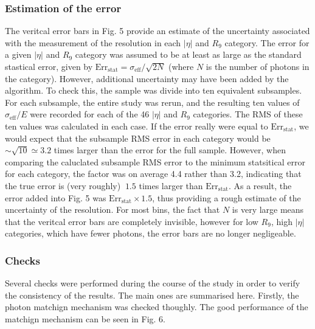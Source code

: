 \documentclass[10pt]{article}
\begin{document}
\subsubsection{Estimation of the error}
The veritcal error bars in Fig. 5 provide an estimate of the uncertainty associated with the measurement of the resolution in each $|\eta|$ and $R_9$ category. The error for a given $|\eta|$ and $R_9$ category was assumed to be at least as large as the standard stastical error, given by $\text{Err}_{\text{stat}} = \sigma_{\text{eff}}/\sqrt{2N}$ (where $N$ is the number of photons in the category). However, additional uncertainty may have been added by the algorithm. To check this, the sample was divide into ten equivalent subsamples. For each subsample, the entire study was rerun, and the resulting ten values of $\sigma_{\text{eff}}/E$ were recorded for each of the 46 $|\eta|$ and $R_9$ categories. The RMS of these ten values was calculated in each case. If the error really were equal to $\text{Err}_{\text{stat}}$, we would expect that the subsample RMS error in each category would be $\sim \sqrt{10} \simeq 3.2$ times larger than the error for the full sample. However, when comparing the caluclated subsample RMS error to the minimum statsitical error for each category, the factor was on average 4.4 rather than 3.2, indicating that the true error is (very roughly) $~1.5$ times larger than $\text{Err}_{\text{stat}} $. As a result, the error added into Fig. 5 was $\text{Err}_{\text{stat}} \times 1.5$, thus providing a rough estimate of the uncertainty of the resolution. For most bins, the fact that $N$ is very large means that the veritcal error bars are completely invisible, however for low $R_9$, high $|\eta|$ categories, which have fewer photons, the error bars are no longer negligeable.

\subsubsection{Checks}

Several checks were performed during the course of the study in order to verify the consistency of the results. The main ones are summarised here. Firstly, the photon matchign mechanism was checked thoughly. The good performance of the matchign mechanism can be seen in Fig. 6.
\end{document}
